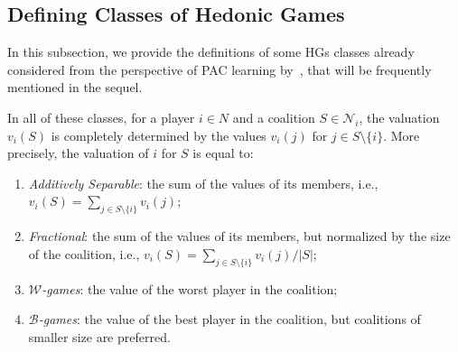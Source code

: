 \documentclass[letterpaper]{article} %
\newcommand{\modulus}[1]{\vert #1 \vert}
\newcommand{\Ni}{\mathcal{N}_i}
\newcommand{\W}{\ensuremath{\mathcal{W}}}
\begin{document}
\subsection{Defining Classes of Hedonic Games}
In this subsection, we provide the definitions of some HGs classes already considered from the perspective of PAC learning by~\cite{SliwinskiZ17}, that will be frequently mentioned in the sequel.

In all of these classes, for a player $i \in N$ and a coalition $S\in\Ni$, the valuation $v_i(S)$ is completely determined by the values $v_i(j)$ for $j \in S\setminus \{i\}$. More precisely, the valuation of $i$ for $S$ is equal to:
\begin{enumerate}
    \item \emph{Additively Separable}: the sum of the values of its members, i.e., $v_i(S) = \sum_{j \in S\setminus\{i\}} v_i(j)$;
    \item \emph{Fractional}: the sum of the values of its members, but normalized by the size of the coalition, i.e., $v_i(S) = \sum_{j \in S\setminus\{i\}} v_i(j)/ \modulus{S}$;
    \item \emph{$\W$-games}: the value of the worst player in the coalition;
    \item \emph{$\mathcal{B}$-games}: the value of the best player in the coalition, but coalitions of smaller size are preferred.
\end{enumerate}
\end{document}
